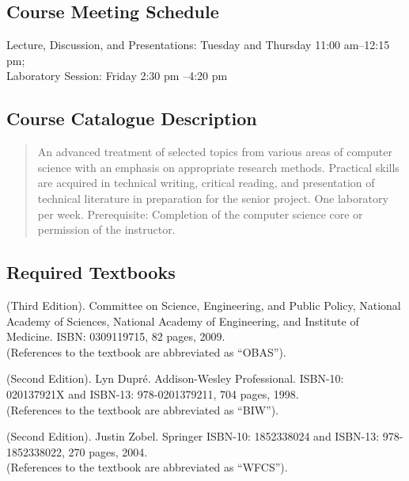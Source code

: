 \vspace{-.1in}
\subsection*{Course Meeting Schedule}

Lecture, Discussion, and Presentations: Tuesday and Thursday
11:00 am--12:15 pm; \\ Laboratory Session: Friday 2:30 pm --4:20 pm

\vspace{-.15in}
\subsection*{Course Catalogue Description}

\begin{quote}

  An advanced treatment of selected topics from various areas of computer science with an emphasis on appropriate
  research methods.  Practical skills are acquired in technical writing, critical reading, and presentation of technical
  literature in preparation for the senior project. One laboratory per week. Prerequisite: Completion of the computer
  science core or permission of the instructor.

\end{quote}

\vspace{-.25in}
\subsection*{Required Textbooks}

 (Third Edition).  Committee on Science,
Engineering, and Public Policy, National Academy of Sciences, National Academy of Engineering, and Institute of
Medicine. ISBN: 0309119715, 82 pages, 2009.\\ (References to the textbook are abbreviated as ``OBAS'').

 (Second Edition). Lyn Dupr\'e.  Addison-Wesley
Professional.  ISBN-10: 020137921X and ISBN-13: 978-0201379211, 704 pages, 1998.\\ (References to the textbook are
abbreviated as ``BIW'').

 (Second Edition).  Justin Zobel.  Springer ISBN-10: 1852338024 and ISBN-13:
978-1852338022, 270 pages, 2004. \\ (References to the textbook are abbreviated as ``WFCS'').

